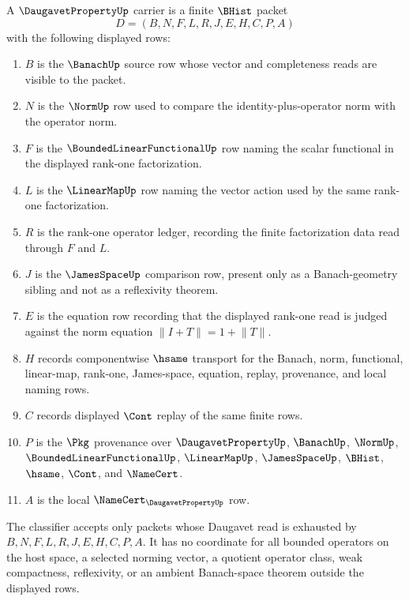 \begin{definition}
\label{def:daugavet-property-carrier}
A $\DaugavetPropertyUp$ carrier is a finite $\BHist$ packet
$$
D=(B,N,F,L,R,J,E,H,C,P,A)
$$
with the following displayed rows:
\begin{enumerate}
\item $B$ is the $\BanachUp$ source row whose vector and completeness reads are visible to the packet.
\item $N$ is the $\NormUp$ row used to compare the identity-plus-operator norm with the operator norm.
\item $F$ is the $\BoundedLinearFunctionalUp$ row naming the scalar functional in the displayed rank-one factorization.
\item $L$ is the $\LinearMapUp$ row naming the vector action used by the same rank-one factorization.
\item $R$ is the rank-one operator ledger, recording the finite factorization data read through $F$ and $L$.
\item $J$ is the $\JamesSpaceUp$ comparison row, present only as a Banach-geometry sibling and not as a reflexivity theorem.
\item $E$ is the equation row recording that the displayed rank-one read is judged against the norm equation $\lVert I+T\rVert=1+\lVert T\rVert$.
\item $H$ records componentwise $\hsame$ transport for the Banach, norm, functional, linear-map, rank-one, James-space, equation, replay, provenance, and local naming rows.
\item $C$ records displayed $\Cont$ replay of the same finite rows.
\item $P$ is the $\Pkg$ provenance over $\DaugavetPropertyUp$, $\BanachUp$, $\NormUp$, $\BoundedLinearFunctionalUp$, $\LinearMapUp$, $\JamesSpaceUp$, $\BHist$, $\hsame$, $\Cont$, and $\NameCert$.
\item $A$ is the local $\NameCert_{\DaugavetPropertyUp}$ row.
\end{enumerate}
The classifier accepts only packets whose Daugavet read is exhausted by $B,N,F,L,R,J,E,H,C,P,A$. It has no coordinate for all bounded operators on the host space, a selected norming vector, a quotient operator class, weak compactness, reflexivity, or an ambient Banach-space theorem outside the displayed rows.
\end{definition}

